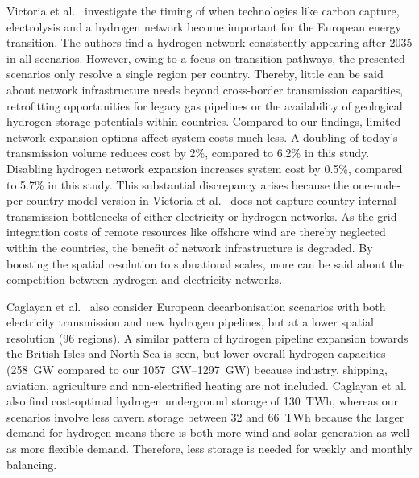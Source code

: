 Victoria et al.~\cite{victoriaSpeedTechnological2022} investigate the timing of
when technologies like carbon capture, electrolysis and a hydrogen network
become important for the European energy transition. The authors find a hydrogen
network consistently appearing after 2035 in all scenarios. However, owing to a
focus on transition pathways, the presented scenarios only resolve a single
region per country. Thereby, little can be said about network infrastructure
needs beyond cross-border transmission capacities, retrofitting opportunities
for legacy gas pipelines or the availability of geological hydrogen storage
potentials within countries. Compared to our findings, limited network expansion
options affect system costs much less. A doubling of today's transmission volume
reduces cost by 2\%, compared to 6.2\% in this study. Disabling hydrogen network
expansion increases system cost by 0.5\%, compared to 5.7\% in this study. This
substantial discrepancy arises because the one-node-per-country model version in
Victoria et al.~\cite{victoriaSpeedTechnological2022} does not capture
country-internal transmission bottlenecks of either electricity or hydrogen
networks. As the grid integration costs of remote resources like offshore wind
are thereby neglected within the countries, the benefit of network
infrastructure is degraded. By boosting the spatial resolution to subnational
scales, more can be said about the competition between hydrogen and electricity
networks.

Caglayan et al.~\cite{Caglayan2019} also consider European decarbonisation
scenarios with both electricity transmission and new hydrogen pipelines, but at
a lower spatial resolution (96 regions). A similar pattern of hydrogen pipeline
expansion towards the British Isles and North Sea is seen, but lower overall
hydrogen capacities (258~GW compared to our \SIrange{1057}{1297}{\giga\watt})
because industry, shipping, aviation, agriculture and non-electrified heating
are not included. Caglayan et al.~\cite{Caglayan2019} also find cost-optimal
hydrogen underground storage of 130~TWh, whereas our scenarios involve less
cavern storage between 32 and 66~TWh because the larger demand for hydrogen
means there is both more wind and solar generation as well as more flexible demand.
Therefore, less storage is needed for weekly and monthly balancing.

